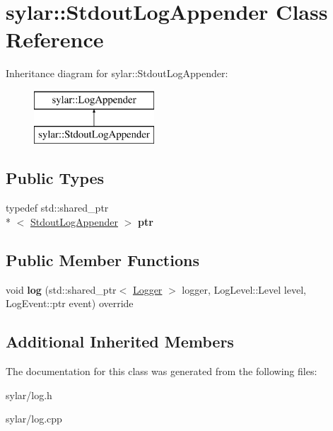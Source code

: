 \hypertarget{classsylar_1_1StdoutLogAppender}{\section{sylar\-:\-:Stdout\-Log\-Appender Class Reference}
\label{classsylar_1_1StdoutLogAppender}
}
Inheritance diagram for sylar\-:\-:Stdout\-Log\-Appender\-:\begin{figure}[H]
\begin{center}
\leavevmode
\includegraphics[height=2.000000cm]{classsylar_1_1StdoutLogAppender}
\end{center}
\end{figure}
\subsection*{Public Types}
\begin{DoxyCompactItemize}
\item 
\hypertarget{classsylar_1_1StdoutLogAppender_a76acd48873c187b8f2bed7759ed6254e}{typedef std\-::shared\-\_\-ptr\\*
$<$ \hyperlink{classsylar_1_1StdoutLogAppender}{Stdout\-Log\-Appender} $>$ {\bfseries ptr}}\label{classsylar_1_1StdoutLogAppender_a76acd48873c187b8f2bed7759ed6254e}

\end{DoxyCompactItemize}
\subsection*{Public Member Functions}
\begin{DoxyCompactItemize}
\item 
\hypertarget{classsylar_1_1StdoutLogAppender_a8d3bf66a044b228d8444d1da3bed2ee6}{void {\bfseries log} (std\-::shared\-\_\-ptr$<$ \hyperlink{classsylar_1_1Logger}{Logger} $>$ logger, Log\-Level\-::\-Level level, Log\-Event\-::ptr event) override}\label{classsylar_1_1StdoutLogAppender_a8d3bf66a044b228d8444d1da3bed2ee6}

\end{DoxyCompactItemize}
\subsection*{Additional Inherited Members}


The documentation for this class was generated from the following files\-:\begin{DoxyCompactItemize}
\item 
sylar/log.\-h\item 
sylar/log.\-cpp\end{DoxyCompactItemize}
